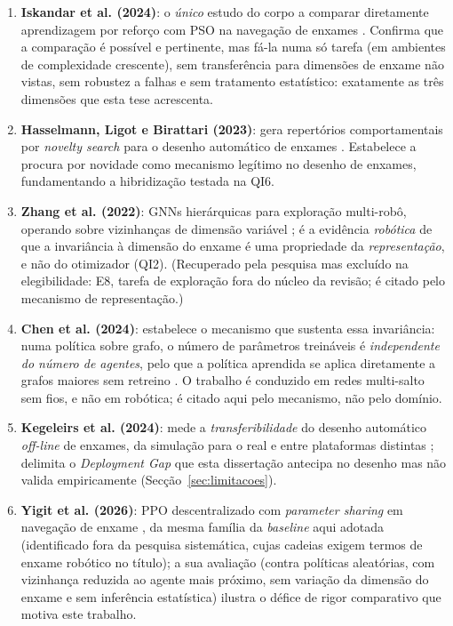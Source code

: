 \documentclass[12pt,reqno, twoside]{amsbook}
\theoremstyle{plain}
\numberwithin{equation}{chapter}
\numberwithin{section}{chapter}
\numberwithin{table}{chapter}
\numberwithin{figure}{chapter}
\begin{document}
\begin{enumerate}
    \item \textbf{Iskandar et al. (2024)}: o \emph{único} estudo do corpo a comparar diretamente aprendizagem por reforço com PSO na navegação de enxames \cite{iskandar2024comparative}. Confirma que a comparação é possível e pertinente, mas fá-la numa só tarefa (em ambientes de complexidade crescente), sem transferência para dimensões de enxame não vistas, sem robustez a falhas e sem tratamento estatístico: exatamente as três dimensões que esta tese acrescenta.
    \item \textbf{Hasselmann, Ligot e Birattari (2023)}: gera repertórios comportamentais por \textit{novelty search} para o desenho automático de enxames \cite{hasselmann2023novelty}. Estabelece a procura por novidade como mecanismo legítimo no desenho de enxames, fundamentando a hibridização testada na QI6.
    \item \textbf{Zhang et al. (2022)}: GNNs hierárquicas para exploração multi-robô, operando sobre vizinhanças de dimensão variável \cite{zhang2022h2gnn}; é a evidência \emph{robótica} de que a invariância à dimensão do enxame é uma propriedade da \emph{representação}, e não do otimizador (QI2). (Recuperado pela pesquisa mas excluído na elegibilidade: E8, tarefa de exploração fora do núcleo da revisão; é citado pelo mecanismo de representação.)
    \item \textbf{Chen et al. (2024)}: estabelece o mecanismo que sustenta essa invariância: numa política sobre grafo, o número de parâmetros treináveis é \emph{independente do número de agentes}, pelo que a política aprendida se aplica diretamente a grafos maiores sem retreino \cite{chen2024graph}. O trabalho é conduzido em redes multi-salto sem fios, e não em robótica; é citado aqui pelo mecanismo, não pelo domínio.
    \item \textbf{Kegeleirs et al. (2024)}: mede a \emph{transferibilidade} do desenho automático \textit{off-line} de enxames, da simulação para o real e entre plataformas distintas \cite{kegeleirs2024transfer}; delimita o \textit{Deployment Gap} que esta dissertação antecipa no desenho mas não valida empiricamente (Secção~\ref{sec:limitacoes}).
    \item \textbf{Yigit et al. (2026)}: PPO descentralizado com \textit{parameter sharing} em navegação de enxame \cite{yigit2026marl}, da mesma família da \textit{baseline} aqui adotada (identificado fora da pesquisa sistemática, cujas cadeias exigem termos de enxame robótico no título); a sua avaliação (contra políticas aleatórias, com vizinhança reduzida ao agente mais próximo, sem variação da dimensão do enxame e sem inferência estatística) ilustra o défice de rigor comparativo que motiva este trabalho.
\end{enumerate}
\end{document}

